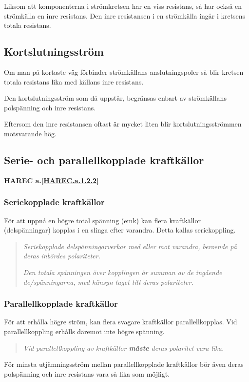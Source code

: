 Liksom att komponenterna i strömkretsen har en viss resistans, så har också en
strömkälla en inre resistans. Den inre resistansen i en strömkälla ingår i
kretsens totala resistans.

\subsection{Kortslutningsström}

Om man på kortaste väg förbinder strömkällans anslutningspoler så blir kretsen
totala resistans lika med källans inre resistans.

Den kortslutningsström som då uppstår, begränsas enbart av strömkällans
polspänning och inre resistans.

Eftersom den inre resistansen oftast är mycket liten blir kortslutningsströmmen
motsvarande hög.

\subsection{Serie- och parallellkopplade kraftkällor}
\textbf{HAREC a.\ref{HAREC.a.1.2.2}\label{myHAREC.a.1.2.2}}

\subsubsection{Seriekopplade kraftkällor}

För att uppnå en högre total spänning (emk) kan flera kraftkällor
(delspänningar) kopplas i en slinga efter varandra. Detta kallas seriekoppling.

\begin{quote}
\emph{Seriekopplade delspänningarverkar med eller mot varandra, beroende på
deras inbördes polariteter.}

\emph{Den totala spänningen över kopplingen är summan av de ingående
de/spänningarna, med hänsyn taget till deras polariteter.}
\end{quote}

\subsubsection{Parallellkopplade kraftkällor}

För att erhålla högre ström, kan flera svagare kraftkällor parallellkopplas. Vid
parallellkoppling erhålls däremot inte högre spänning.

\begin{quote}
\emph{Vid parallellkoppling av kraftkällor \textbf{måste} deras polaritet vara lika.}
\end{quote}

För minsta utjämningsström mellan parallellkopplade kraftkällor bör även deras
polspänning och inre resistans vara så lika
som möjligt.
